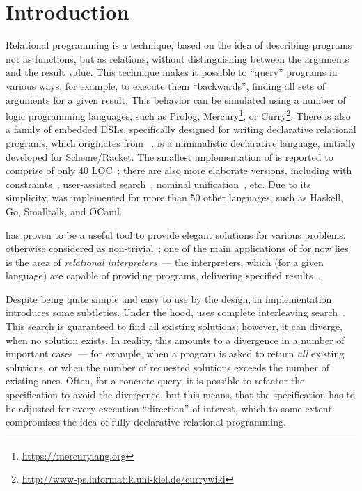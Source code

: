 \section{Introduction}

Relational programming is a technique, based on the idea of describing programs not as functions, but 
as relations, without distinguishing between the arguments and the result value. This technique makes it 
possible to ``query'' programs in various ways, for example, to execute them ``backwards'', finding
all sets of arguments for a given result. This behavior can be simulated using a number of
logic programming languages, such as Prolog, Mercury\footnote{\url{https://mercurylang.org}}, 
or Curry\footnote{\url{http://www-ps.informatik.uni-kiel.de/currywiki}}. 
There is also a family of embedded DSLs, specifically designed for writing declarative relational
programs, which originates from \miniKanren~\cite{TRS}. \miniKanren is a minimalistic 
declarative language, initially developed for Scheme/Racket. The smallest implementation of \miniKanren 
is reported to comprise of only 40 LOC~\cite{MicroKanren,2016}; there are also more elaborate versions, including
\miniKanren with constraints~\cite{CKanren,CKanren1}, user-assisted search~\cite{Guided}, nominal unification~\cite{AlphaKanren},
etc. Due to its simplicity, \miniKanren was implemented for more than 50 other languages, such as
Haskell, Go, Smalltalk, and OCaml.

\miniKanren has proven to be a useful tool to provide elegant solutions for various problems, otherwise considered as non-trivial~\cite{WillThesis};
one of the main applications of \miniKanren for now lies is the area of \emph{relational interpreters}~--- the interpreters, which (for a given language)
are capable of providing programs, delivering specified results~\cite{Untagged}.

Despite being quite simple and easy to use by the design, in implementation \miniKanren introduces some subtleties. Under the hood, \miniKanren 
uses complete interleaving search~\cite{Search}. This search is guaranteed to find all existing solutions; however, it can diverge, when no 
solution exists. In reality, this amounts to a divergence in a number of important cases~--- for example, when a program is asked to 
return \emph{all} existing solutions, or when the number of requested solutions exceeds the number of existing ones. Often, for a 
concrete query, it is possible to refactor the specification to avoid the divergence, but this means, that the specification has to be adjusted for every 
execution ``direction'' of interest, which to some extent compromises the idea of fully declarative relational programming. 

